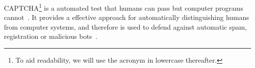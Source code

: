 CAPTCHA\footnote{To aid readability, we will use the acronym in lowercase thereafter.} is a automated test that humans can pass but
computer programs cannot~\cite{Von2004Telling}. It provides a effective approach for automatically distinguishing humans from computer
systems, and therefore is used to defend against automatic spam, registration or malicious bots~\cite{Von2003CAPTCHA,Tam2008Breaking}.
%
%
%
